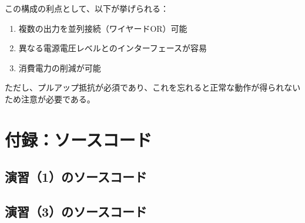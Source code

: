 \documentclass[a4paper,11pt,dvipdfmx]{jsarticle}
\begin{document}
この構成の利点として、以下が挙げられる：
\begin{enumerate}
\item 複数の出力を並列接続（ワイヤードOR）可能
\item 異なる電源電圧レベルとのインターフェースが容易
\item 消費電力の削減が可能
\end{enumerate}

ただし、プルアップ抵抗が必須であり、これを忘れると正常な動作が得られないため注意が必要である。

\newpage
\section{付録：ソースコード}
\subsection{演習（1）のソースコード}


\subsection{演習（3）のソースコード}

\end{document}
